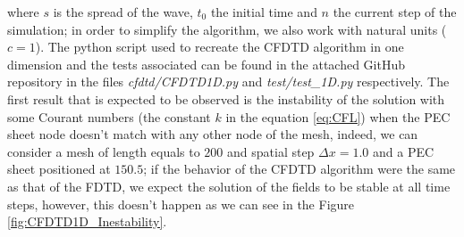 \documentclass[12pt, oneside]{book}
\begin{document}
where $s$ is the spread of the wave, $t_0$ the initial time and $n$ the current step of the simulation; in order to simplify the algorithm, we also work with natural units ($c=1$). The python script used to recreate the CFDTD algorithm in one dimension and the tests associated can be found in the attached GitHub repository in the files \textit{cfdtd/CFDTD1D.py} and \textit{test/test\_1D.py} respectively. The first result that is expected to be observed is the instability of the solution with some Courant numbers (the constant $k$ in the equation \ref{eq:CFL}) when the PEC sheet node doesn't match with any other node of the mesh, indeed, we can consider a mesh of length equals to $200$ and spatial step $\Delta x = 1.0$ and a PEC sheet positioned at $150.5$; if the behavior of the CFDTD algorithm were the same as that of the FDTD, we expect the solution of the fields to be stable at all time steps, however, this doesn't happen as we can see in the Figure \ref{fig:CFDTD1D_Inestability}.
\end{document}
